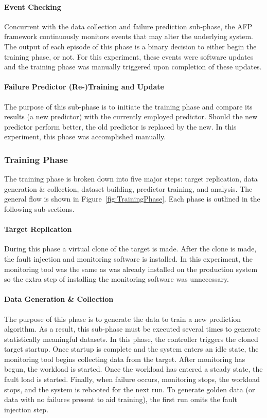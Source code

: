 \paragraph{Event Checking}
Concurrent with the data collection and failure prediction sub-phase, the
\ac{AFP} framework continuously monitors events that may alter the underlying
system.  The output of each episode of this phase is a binary decision to
either begin the training phase, or not.  For this experiment, these events
were software updates and the training phase was manually triggered upon
completion of these updates.

\paragraph{Failure Predictor (Re-)Training and Update}
The purpose of this sub-phase is to initiate the training phase and compare its
results (a new predictor) with the currently employed predictor.  Should the
new predictor perform better, the old predictor is replaced by the new.  In
this experiment, this phase was accomplished manually.

\subsubsection{Training Phase}
The training phase is broken down into five major steps:  target replication,
data generation \& collection, dataset building, predictor training, and
analysis.  The general flow is shown in Figure~\ref{fig:TrainingPhase}.  Each
phase is outlined in the following sub-sections.

\figTrainingPhase{4in}

\paragraph{Target Replication}
During this phase a virtual clone of the target is made.  After the clone is
made, the fault injection and monitoring software is installed.  In this
experiment, the monitoring tool was the same as was already installed on the
production system so the extra step of installing the monitoring software was
unnecessary.

\paragraph{Data Generation \& Collection}
The purpose of this phase is to generate the data to train a new prediction
algorithm.  As a result, this sub-phase must be executed several times to
generate statistically meaningful datasets.  In this phase, the controller
triggers the cloned target startup.  Once startup is complete and the system
enters an idle state, the monitoring tool begins collecting data from the
target.  After monitoring has begun, the workload is started.  Once the
workload has entered a steady state, the fault load is started.  Finally, when
failure occurs, monitoring stops, the workload stops, and the system is
rebooted for the next run.  To generate golden data (or data with no failures
present to aid training), the first run omits the fault injection step.


